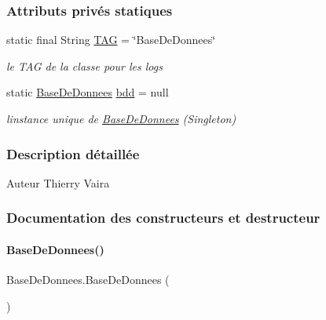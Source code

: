 \subsubsection*{Attributs privés statiques}
\begin{DoxyCompactItemize}
\item 
static final String \hyperlink{classfr_1_1campus_1_1laurainc_1_1honeybee_1_1_base_de_donnees_ae800d867b3e423dd139e982736ab5587}{T\+AG} = \char`\"{}Base\+De\+Donnees\char`\"{}
\begin{DoxyCompactList}\small\item\em le T\+AG de la classe pour les logs \end{DoxyCompactList}\item 
static \hyperlink{classfr_1_1campus_1_1laurainc_1_1honeybee_1_1_base_de_donnees}{Base\+De\+Donnees} \hyperlink{classfr_1_1campus_1_1laurainc_1_1honeybee_1_1_base_de_donnees_a6afcd3f4c69f15afa0c675a848bf97a7}{bdd} = null
\begin{DoxyCompactList}\small\item\em l\textquotesingle{}instance unique de \hyperlink{classfr_1_1campus_1_1laurainc_1_1honeybee_1_1_base_de_donnees}{Base\+De\+Donnees} (Singleton) \end{DoxyCompactList}\end{DoxyCompactItemize}


\subsubsection{Description détaillée}
\begin{DoxyAuthor}{Auteur}
Thierry Vaira 
\end{DoxyAuthor}


\subsubsection{Documentation des constructeurs et destructeur}
\mbox{\label{classfr_1_1campus_1_1laurainc_1_1honeybee_1_1_base_de_donnees_ac4d0c514f439b3a19dc35c159955373a}} 
\paragraph{\texorpdfstring{Base\+De\+Donnees()}{BaseDeDonnees()}\hspace{0.1cm}{\footnotesize\ttfamily [1/4]}}
{\footnotesize\ttfamily Base\+De\+Donnees.\+Base\+De\+Donnees (\begin{DoxyParamCaption}{ }\end{DoxyParamCaption})\hspace{0.3cm}{\ttfamily [private]}}

